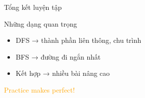 \documentclass{beamer}
\begin{document}
\begin{frame}{Tổng kết luyện tập}

\begin{block}{Những dạng quan trọng}
\begin{itemize}
    \item DFS → thành phần liên thông, chu trình
    \item BFS → đường đi ngắn nhất
    \item Kết hợp → nhiều bài nâng cao
\end{itemize}
\end{block}

\pause

\begin{center}
\Huge  \textcolor{orange}{Practice makes perfect!}
\end{center}

\end{frame}
\end{document}
